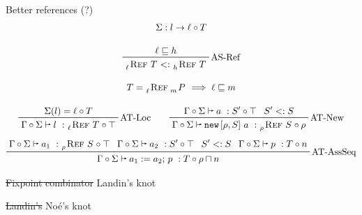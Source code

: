 \documentclass[aspectratio=169]{beamer}
\begin{document}
\begin{frame}{Better references (?)}
    \begin{gather*}
        \Sigma: l \rightarrow \pair{\ell}{T}
        \\[1em]
        \prftree[r]{AS-Ref}
            {\ell \lsub \ahh}
            {\reftype{\ell}{T} \atsub \reftype{\ahh}{T}}
        \\[1em]
        T = \reftype{\ell}{\type{\emm}{P}} \implies \ell \lsub \emm
        \\[1em]
        \prftree[r]{AT-Loc}
            {\Sigma(l) = \pair{\ell}{T}}
            {\ajudgment{\Gamma}{\Sigma}{l}{\reftype{\ell}{T}}{\top}}
        \qquad
        \prftree[r]{AT-New}
            {\ajudgment{\Gamma}{\Sigma}{a}{S'}{\top}}
            {S' \atsub S}
            {\ajudgment{\Gamma}{\Sigma}{\enew{\epp,S}{a}}{\reftype{\epp}{S}}{\epp}}
        \\[0.5em]
        \prftree[r]{AT-AssSeq}
            {\ajudgment{\Gamma}{\Sigma}{a_1}{\reftype{\epp}{S}}{\top}}
            {\ajudgment{\Gamma}{\Sigma}{a_2}{S'}{\top}}
            {S' \atsub S}
            {\ajudgment{\Gamma}{\Sigma}{p}{T}{\enn}}
            {\ajudgment{\Gamma}{\Sigma}{\asseq{a_1}{a_2}{p}}{T}{\epp \glb \enn}}
    \end{gather*}
\end{frame}

\begin{frame}{\st{Fixpoint combinator} Landin's knot}
    
\end{frame}

\begin{frame}{\st{Landin's} Noé's knot}
    
\end{frame}
\end{document}
